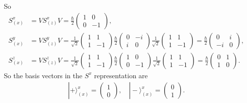 \documentclass[../../main.tex]{subfiles}
\begin{document}
\begin{enumerate}
{{  So
  \begin{align*}
    S^{x}_{(x)} &= VS^{x}_{(z)}V = \frac{\hbar}{2}\begin{pmatrix}
      1&0\\
      0&-1
    \end{pmatrix},\\ 
    S^{y}_{(x)} &= VS^{y}_{(z)}V = \frac{1}{\sqrt{2}}\begin{pmatrix}
      1 & 1 \\
      1 & -1
    \end{pmatrix}\frac{\hbar}{2}\begin{pmatrix}
      0 & -i \\
      i & 0
    \end{pmatrix}\frac{1}{\sqrt{2}}\begin{pmatrix}
      1 & 1 \\
      1 & -1
    \end{pmatrix} = \frac{\hbar}{2}\begin{pmatrix}
      0 & i\\
      -i & 0
    \end{pmatrix},\\
    S^{z}_{(x)} &= VS^{z}_{(z)}V = \frac{1}{\sqrt{2}}\begin{pmatrix}
      1 & 1 \\
      1 & -1
    \end{pmatrix}\frac{\hbar}{2}\begin{pmatrix}
      1 & 0 \\
      0 & -1
    \end{pmatrix}\frac{1}{\sqrt{2}}\begin{pmatrix}
      1 & 1 \\
      1 & -1
    \end{pmatrix} = \frac{\hbar}{2}\begin{pmatrix}
      0 & 1\\
      1 & 0
    \end{pmatrix}.
  \end{align*}
  So the basis vectors in the $S^{x}$ representation are 
  \begin{align*}
    |+\rangle_{(x)}^{x} = \begin{pmatrix}
      1\\
      0
    \end{pmatrix},\quad |-\rangle_{(x)}^{x} = \begin{pmatrix}
      0\\
      1
    \end{pmatrix}.
  \end{align*}}}
\end{enumerate}
\end{document}
